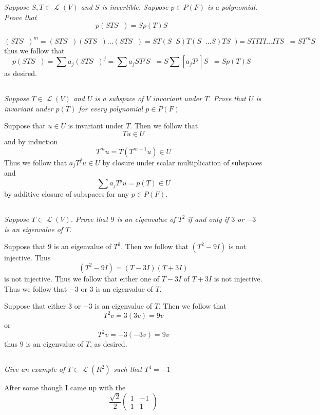 \documentclass[11pt,oneside,titlepage]{book}
\DeclareMathOperator \map {\mathcal {L}}
\DeclareMathOperator \inv {^{-1}}
\begin{document}
\textit{Suppose $S, T \in \map(V)$ and $S$ is invertible. Suppose $p \in P(F)$ is a polynomial.
  Prove that }
$$p(STS\inv) = S p(T) S\inv$$

$$(STS\inv)^m = (STS\inv)(STS\inv)...(STS\inv) =
ST(S\inv S)T(S\inv ...S)TS\inv) = STITI...ITS\inv = ST^mS\inv$$
thus we follow that
$$p(STS\inv) = \sum {a_j (STS\inv)^j} = \sum {a_j ST^jS\inv} = S\sum {[a_j T^j]}S\inv = Sp(T)S\inv$$
as desired.

\subsection{}

\textit{Suppose $T \in \map(V)$ and $U$ is a subspace of $V$ invariant under $T$. Prove that
  $U$ is invariant under $p(T)$ for every polynomial $p \in P(F)$}

Suppose that $u \in U$ is invariant under $T$. Then we follow that
$$Tu \in U$$
and by induction
$$T^mu = T(T^{m - 1}u) \in U$$
Thus we follow that $a_j T^ju  \in U$ by  closure under scalar multiplication of subspaces and 
$$\sum{a_j T^ju} = p(T) \in U$$
by additive closure of subspaces for any $p \in P(F)$.

\subsection{}

\textit{Suppose $T \in \map(V)$. Prove that $9$ is an eigenvalue of $T^2$ if and only if
  $3$ or $-3$ is an eigenvalue of $T$.}

Suppose that $9$ is an eigenvalue of $T^2$. Then we follow that $(T^2 - 9I)$ is not injective.
Thus
$$(T^2 - 9I) = (T - 3I)(T + 3I)$$
is not injective. Thus we follow that either one of $T - 3I$ of $T + 3I$ is not injective. Thus
we follow that $-3$ or $3$ is an eigenvalue of $T$.

Suppose that either $3$ or $-3$ is an eigenvalue of $T$. Then we follow that
$$T^2v = 3(3v) = 9v$$
or
$$T^2v = -3(-3v) = 9v$$
thus $9$ is an eigenvalue of $T$, as desired.

\subsection{}

\textit{Give an example of $T \in \map(R^2)$ such that $T^4 = -1$}

After some though I came up with the
$$
\frac{\sqrt{2}}{2}
\begin{pmatrix}
  1 & -1 \\
  1 & 1
\end{pmatrix}
$$
\end{document}

